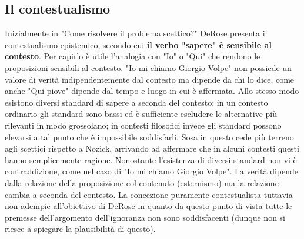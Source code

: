 \documentclass[10pt,a4paper]{article}
\begin{document}
\subsection{Il contestualismo}
Inizialmente in "Come risolvere il problema scettico?" DeRose presenta il contestualismo epistemico, secondo cui \textbf{il verbo "sapere" è sensibile al contesto}. Per capirlo è utile l'analogia con "Io"
o "Qui" che rendono le proposizioni sensibili al contesto. "Io mi chiamo Giorgio Volpe" non possiede un valore di verità indipendentemente dal contesto ma dipende da chi lo dice, come anche "Qui piove" dipende dal tempo e luogo in cui è affermata. Allo stesso modo esistono diversi standard di sapere a seconda del contesto: in un contesto ordinario gli standard sono bassi ed è sufficiente escludere le alternative più rilevanti in modo grossolano; in contesti filosofici invece gli standard possono elevarsi a tal punto che è impossibile soddisfarli. Sosa in questo cede più terreno agli scettici rispetto a Nozick, arrivando ad affermare che in alcuni contesti questi hanno semplicemente ragione. Nonostante l'esistenza di diversi standard non vi è contraddizione, come nel caso di "Io mi chiamo Giorgio Volpe". La verità dipende dalla relazione della proposizione col contenuto (esternismo) ma la relazione cambia a seconda del contesto. La concezione puramente contestualista tuttavia non adempie all'obiettivo di DeRose in quanto da questo punto di vista tutte le premesse dell'argomento dell'ignoranza non sono soddisfacenti (dunque non si riesce a spiegare la plausibilità di questo).
\end{document}
